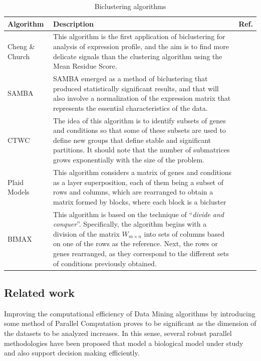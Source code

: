 \documentclass[a4paper,conference]{IEEEtran}
\begin{document}
\begin{table}[!h]
\renewcommand{\arraystretch}{1.5}
\caption{Biclustering algorithms}
\label{Biclustering_alg}
\centering
\begin{tabular}{p{2cm}|p{5.4cm}|p{0.3cm}} 
\hline
\bfseries Algorithm & \bfseries Description & Ref. \\
\hline
Cheng \& Church & This algorithm is the first application of biclustering for analysis of expression profile, and the aim is to find more delicate signals than the clustering algorithm using the Mean Residue Score.  &~\cite{cheng2000biclustering} \\
\hline
SAMBA & SAMBA emerged as a method of biclustering that produced statistically significant results, and that will also involve a normalization of the expression matrix that represents the essential characteristics of the data. &~\cite{fiannaca2015analysis}  \\
\hline
CTWC & The idea of this algorithm is to identify subsets of genes and conditions so that some of these subsets are used to define new groups that define stable and significant partitions. It should note that the number of submatrices grows exponentially with the size of the problem. &~\cite{wani2017novel}\\
\hline
Plaid Models & This algorithm considers a matrix of genes and conditions as a layer superposition, each of them being a subset of rows and columns, which are rearranged to obtain a matrix formed by blocks, where each block is a bicluster &~\cite{oghabian2014biclustering} \\
\hline
BIMAX & This algorithm is based on the technique of ``\textit{divide and conquer}''. Specifically, the algorithm begins with a division of the matrix $ W_{m\times n} $ into sets of columns based on one of the rows as the reference. Next, the rows or genes rearranged, as they correspond to the different sets of conditions previously obtained. &~\cite{roy2016analysis} \\
\hline
\end{tabular}
\end{table}

\subsection{Related work}\label{sc.rw}

Improving the computational efficiency of Data Mining algorithms by introducing some method of Parallel Computation proves to be significant as the dimension of the datasets to be analyzed increases. In this sense, several robust parallel methodologies have been proposed that model a biological model under study and also support decision making efficiently.
\end{document}
